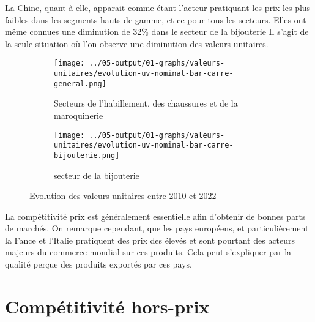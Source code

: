 \documentclass[french,10pt,a4paper]{article}
\begin{document}
La Chine, quant à elle, apparait comme étant l'acteur pratiquant les prix les plus faibles dans les segments hauts de gamme, et ce pour tous les secteurs. Elles ont même connues une diminution de 32\% dans le secteur de la bijouterie Il s'agit de la seule situation où l'on observe une diminution des valeurs unitaires.

\begin{figure}[!h]
  \centering
  \begin{subfigure}{\textwidth}
    \centering    \texttt{[image: ../05-output/01-graphs/valeurs-unitaires/evolution-uv-nominal-bar-carre-general.png]}
    \caption{Secteurs de l'habillement, des chaussures et de la maroquinerie}
    \label{fig:evolution-uv-nominal-bar-carre-general}
  \end{subfigure}
  \vspace{0.5cm}
  \begin{subfigure}{\textwidth}
    \centering \texttt{[image: ../05-output/01-graphs/valeurs-unitaires/evolution-uv-nominal-bar-carre-bijouterie.png]}
 \caption{secteur de la bijouterie}
 \label{fig:evolution-uv-nominal-bar-carre-bijouterie.png}
  \end{subfigure}
  \caption{Evolution des valeurs unitaires entre 2010 et 2022}
  \label{fig:valeurs-unitaires}
\end{figure}

La compétitivité prix est généralement essentielle afin d'obtenir de bonnes parts de marchés. On remarque cependant, que les pays européens, et particulièrement la Fance et l'Italie pratiquent des prix des élevés et sont pourtant des acteurs majeurs du commerce mondial sur ces produits. Cela peut s'expliquer par la qualité perçue des produits exportés par ces pays.

\section{Compétitivité hors-prix}




\end{document}
